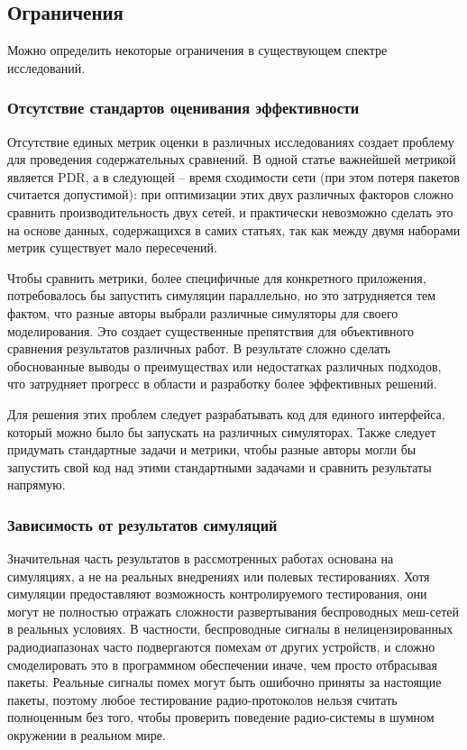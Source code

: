 \documentclass[%
]{report}
\begin{document}
\subsection{Ограничения}\label{limitations}

Можно определить некоторые ограничения в существующем спектре
исследований.

\subsubsection{Отсутствие стандартов оценивания эффективности}\label{lack-of-uniform-evaluation-standards}

Отсутствие единых метрик оценки в различных исследованиях
создает проблему для проведения содержательных сравнений.
В одной статье важнейшей метрикой является PDR,
а в следующей -- время сходимости сети
(при этом потеря пакетов считается допустимой):
при оптимизации этих двух различных факторов
сложно сравнить производительность двух сетей,
и практически невозможно сделать это на основе данных,
содержащихся в самих статьях,
так как между двумя наборами метрик существует мало пересечений.

Чтобы сравнить метрики, более специфичные для
конкретного приложения, потребовалось бы запустить
симуляции параллельно, но это затрудняется тем фактом,
что разные авторы выбрали различные симуляторы для своего моделирования.
Это создает существенные препятствия для
объективного сравнения результатов различных работ.
В результате сложно сделать обоснованные выводы
о преимуществах или недостатках различных подходов,
что затрудняет прогресс в области и разработку
более эффективных решений.

Для решения этих проблем
следует разрабатывать код для единого интерфейса,
который можно было бы запускать на различных симуляторах.
Также следует придумать стандартные задачи
и метрики, чтобы
разные авторы могли бы запустить свой код
над этими стандартными задачами и сравнить результаты напрямую.

\subsubsection{Зависимость от результатов симуляций}\label{dependence-on-simulation-based-evidence}

Значительная часть результатов в
рассмотренных работах основана на симуляциях,
а не на реальных внедрениях или полевых тестированиях.
Хотя симуляции предоставляют возможность контролируемого
тестирования, они могут не полностью отражать
сложности развертывания беспроводных меш-сетей в
реальных условиях. В частности,
беспроводные сигналы в нелицензированных радиодиапазонах
часто подвергаются помехам от других устройств,
и сложно смоделировать это в программном обеспечении иначе,
чем просто отбрасывая пакеты.
Реальные сигналы помех могут быть ошибочно приняты
за настоящие пакеты,
поэтому любое тестирование радио-протоколов
нельзя считать полноценным без того, чтобы проверить
поведение радио-системы в шумном окружении в реальном мире.
\end{document}
